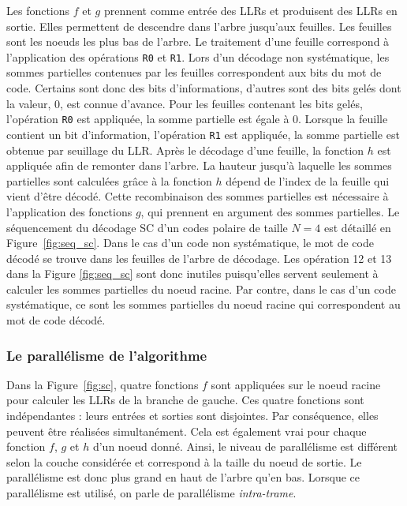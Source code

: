 Les fonctions $f$ et $g$ prennent comme entrée des LLRs et produisent des LLRs en sortie. Elles permettent de descendre dans l'arbre jusqu'aux feuilles. Les feuilles sont les noeuds les plus bas de l'arbre. Le traitement d'une feuille correspond à l'application des opérations \texttt{R0} et \texttt{R1}. Lors d'un décodage non systématique, les sommes partielles contenues par les feuilles correspondent aux bits du mot de code. Certains sont donc des bits d'informations, d'autres sont des bits gelés dont la valeur, $0$, est connue d'avance. Pour les feuilles contenant les bits gelés, l'opération \texttt{R0} est appliquée, la somme partielle est égale à 0. Lorsque la feuille contient un bit d'information, l'opération \texttt{R1} est appliquée, la somme partielle est obtenue par seuillage du LLR. Après le décodage d'une feuille, la fonction $h$ est appliquée afin de remonter dans l'arbre. La hauteur jusqu'à laquelle les sommes partielles sont calculées grâce à la fonction $h$ dépend de l'index de la feuille qui vient d'être décodé. Cette recombinaison des sommes partielles est nécessaire à l'application des fonctions $g$, qui prennent en argument des sommes partielles. Le séquencement du décodage SC d'un codes polaire de taille $N=4$ est détaillé en Figure~\ref{fig:seq_sc}. Dans le cas d'un code non systématique, le mot de code décodé se trouve dans les feuilles de l'arbre de décodage. Les opération 12 et 13 dans la Figure \ref{fig:seq_sc} sont donc inutiles puisqu'elles servent seulement à calculer les sommes partielles du noeud racine. Par contre, dans le cas d'un code systématique, ce sont les sommes partielles du noeud racine qui correspondent au mot de code décodé.

\subsubsection{Le parallélisme de l'algorithme}
Dans la Figure~\ref{fig:sc}, quatre fonctions $f$ sont appliquées sur le noeud racine pour calculer les LLRs de la branche de gauche. Ces quatre fonctions sont indépendantes : leurs entrées et sorties sont disjointes. Par conséquence, elles peuvent être réalisées simultanément. Cela est également vrai pour chaque fonction $f$, $g$ et $h$ d'un noeud donné. Ainsi, le niveau de parallélisme est différent selon la couche considérée et correspond à la taille du noeud de sortie. Le parallélisme est donc plus grand en haut de l'arbre qu'en bas. Lorsque ce parallélisme est utilisé, on parle de parallélisme \textit{intra-trame}.


